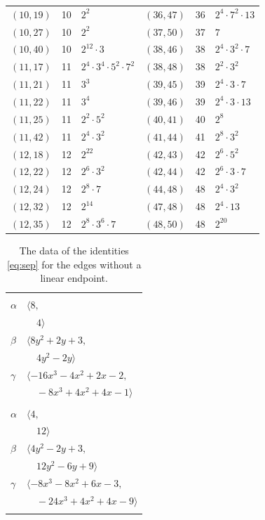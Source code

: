 \documentclass[11pt]{article}
\begin{document}
\begin{longtable}{@{}lrl@{\qquad}lrl@{}}
$(10,19)$ & 10 & $2^{2}$ & $(36,47)$ & 36 & $2^{4}\cdot 7^{2}\cdot 13$\\
$(10,27)$ & 10 & $2^{2}$ & $(37,50)$ & 37 & $7$\\
$(10,40)$ & 10 & $2^{12}\cdot 3$ & $(38,46)$ & 38 & $2^{4}\cdot 3^{2}\cdot 7$\\
$(11,17)$ & 11 & $2^{4}\cdot 3^{4}\cdot 5^{2}\cdot 7^{2}$ & $(38,48)$ & 38 & $2^{2}\cdot 3^{2}$\\
$(11,21)$ & 11 & $3^{3}$ & $(39,45)$ & 39 & $2^{4}\cdot 3\cdot 7$\\
$(11,22)$ & 11 & $3^{4}$ & $(39,46)$ & 39 & $2^{4}\cdot 3\cdot 13$\\
$(11,25)$ & 11 & $2^{2}\cdot 5^{2}$ & $(40,41)$ & 40 & $2^{8}$\\
$(11,42)$ & 11 & $2^{4}\cdot 3^{2}$ & $(41,44)$ & 41 & $2^{8}\cdot 3^{2}$\\
$(12,18)$ & 12 & $2^{22}$ & $(42,43)$ & 42 & $2^{6}\cdot 5^{2}$\\
$(12,22)$ & 12 & $2^{6}\cdot 3^{2}$ & $(42,44)$ & 42 & $2^{6}\cdot 3\cdot 7$\\
$(12,24)$ & 12 & $2^{8}\cdot 7$ & $(44,48)$ & 48 & $2^{4}\cdot 3^{2}$\\
$(12,32)$ & 12 & $2^{14}$ & $(47,48)$ & 48 & $2^{4}\cdot 13$\\
$(12,35)$ & 12 & $2^{8}\cdot 3^{6}\cdot 7$ & $(48,50)$ & 48 & $2^{20}$\\
\end{longtable}
\endgroup

\begingroup\scriptsize
\setlength{\LTcapwidth}{\textwidth}
\begin{longtable}{@{}ll@{}}
\caption{The data of the identities \eqref{eq:sep} for the edges without a linear endpoint.}\label{tab:bez}\\
\hline\endfirsthead\hline\endhead\hline\endfoot
\multicolumn{2}{@{}l}{$(i,j)=(17,45)$, $D_{ij}=\langle 9,0\rangle$}\\
$\alpha$ & $\langle 8,$\\
 & $\quad 4\rangle$\\
$\beta$ & $\langle 8y^{2}+2y+3,$\\
 & $\quad 4y^{2}-2y\rangle$\\
$\gamma$ & $\langle -16x^{3}-4x^{2}+2x-2,$\\
 & $\quad -8x^{3}+4x^{2}+4x-1\rangle$\\
\addlinespace[2pt]
\multicolumn{2}{@{}l}{$(i,j)=(18,43)$, $D_{ij}=\langle 7,0\rangle$}\\
$\alpha$ & $\langle 4,$\\
 & $\quad 12\rangle$\\
$\beta$ & $\langle 4y^{2}-2y+3,$\\
 & $\quad 12y^{2}-6y+9\rangle$\\
$\gamma$ & $\langle -8x^{3}-8x^{2}+6x-3,$\\
 & $\quad -24x^{3}+4x^{2}+4x-9\rangle$\\
\addlinespace[2pt]
\end{longtable}
\endgroup
\end{document}
